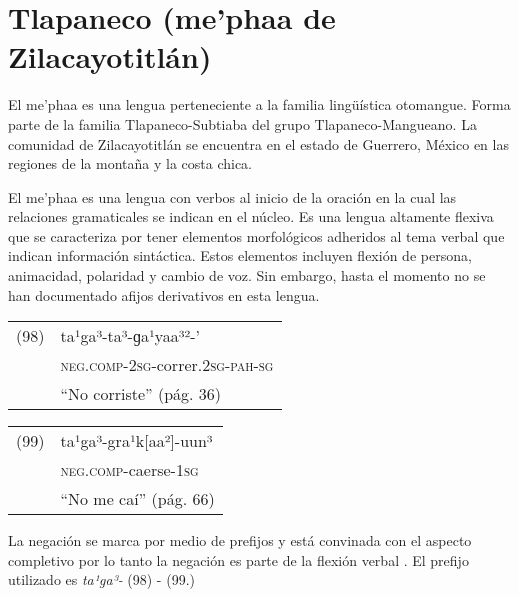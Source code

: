 \section*{Tlapaneco (me’phaa de Zilacayotitlán)}

\noindent El me’phaa es una lengua perteneciente a la familia lingüística otomangue. Forma parte de la familia Tlapaneco-Subtiaba del grupo Tlapaneco-Mangueano. La comunidad de Zilacayotitlán se encuentra en el estado de Guerrero, México en las regiones de la montaña y la costa chica. 

El me'phaa es una lengua con verbos al inicio de la oración en la cual las relaciones gramaticales se indican en el núcleo. Es una lengua altamente flexiva que se caracteriza por tener elementos morfológicos adheridos al tema verbal que indican información sintáctica. Estos elementos incluyen flexión de persona, animacidad, polaridad y cambio de voz. Sin embargo, hasta el momento no se han documentado afijos derivativos en esta lengua. \vspace{0.5cm}

{\setmainfont{Charis SIL} 

\begin{tabular}{ll}
(98) & ta¹ga³-ta³-ɡa¹yaa³²-’\\
& \textsc{neg.comp-2sg}-correr.\textsc{2sg-pah-sg}\\
& ``No corriste'' (pág. 36)
\end{tabular} \vspace{0.5cm}

\begin{tabular}{ll}
(99) & ta¹ga³-gra¹k[aa²]-uun³ \\
& \textsc{neg.comp}-caerse-\textsc{1sg} \\
& ``No me caí'' (pág. 66)
\end{tabular} \vspace{0.5cm}

}

La negación se marca por medio de prefijos y está convinada con el aspecto completivo por lo tanto la negación es parte de la flexión verbal \textcolor{MidnightBlue}{\citep{Tlapaneco}}. El prefijo utilizado es {\setmainfont{Charis SIL} \textit{ta¹ga³-}} (98) - (99.)